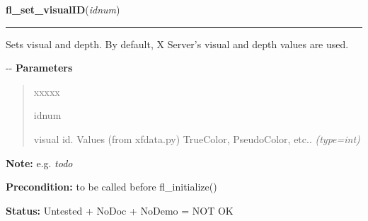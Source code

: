 \hspace{.8\funcindent}\begin{boxedminipage}{\funcwidth}

    \raggedright \textbf{fl\_set\_visualID}(\textit{idnum})

    \vspace{-1.5ex}

    \rule{\textwidth}{0.5\fboxrule}
\setlength{\parskip}{2ex}

Sets visual and depth. By default, X Server's visual and depth values
are used.

-{}-
\setlength{\parskip}{1ex}
      \textbf{Parameters}
      \vspace{-1ex}

      \begin{quote}
        \begin{Ventry}{xxxxx}

          \item[idnum]


visual id. Values (from xfdata.py) TrueColor, PseudoColor, etc..
            {\it (type=int)}

        \end{Ventry}

      \end{quote}

\textbf{Note:} 
e.g. \emph{todo}


\textbf{Precondition:} 
to be called before fl\_initialize()


\textbf{Status:} 
Untested + NoDoc + NoDemo = NOT OK


    \end{boxedminipage}

    \label{xformslib:flxbasic:fl_keysym_pressed}

    \vspace{0.5ex}

